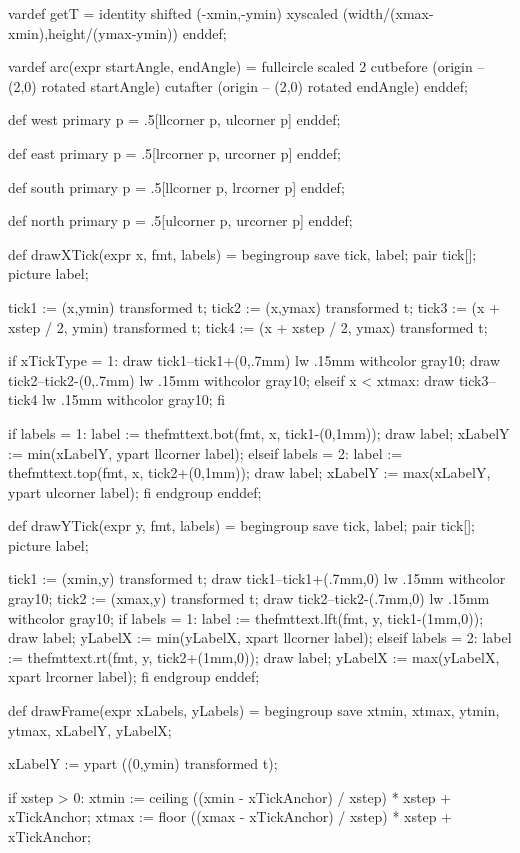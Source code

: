 vardef getT =
  identity shifted (-xmin,-ymin) xyscaled (width/(xmax-xmin),height/(ymax-ymin))
enddef;

vardef arc(expr startAngle, endAngle) =
  fullcircle scaled 2 cutbefore (origin -- (2,0) rotated startAngle) cutafter (origin -- (2,0) rotated endAngle)
enddef;

def west primary p =
  .5[llcorner p, ulcorner p]
enddef;

def east primary p =
  .5[lrcorner p, urcorner p]
enddef;

def south primary p =
  .5[llcorner p, lrcorner p]
enddef;

def north primary p =
  .5[ulcorner p, urcorner p]
enddef;

def drawXTick(expr x, fmt, labels) = begingroup
  save tick, label;
  pair tick[];
  picture label;

  tick1 := (x,ymin) transformed t;
  tick2 := (x,ymax) transformed t;
  tick3 := (x + xstep / 2, ymin) transformed t;
  tick4 := (x + xstep / 2, ymax) transformed t;

  if xTickType = 1:
    draw tick1--tick1+(0,.7mm) lw .15mm withcolor gray10;
    draw tick2--tick2-(0,.7mm) lw .15mm withcolor gray10;
  elseif x < xtmax:
    draw tick3--tick4 lw .15mm withcolor gray10;
  fi

  if labels = 1:
    label := thefmttext.bot(fmt, x, tick1-(0,1mm));
    draw label;
    xLabelY := min(xLabelY, ypart llcorner label);
  elseif labels = 2:
    label := thefmttext.top(fmt, x, tick2+(0,1mm));
    draw label;
    xLabelY := max(xLabelY, ypart ulcorner label);
  fi
endgroup enddef;

def drawYTick(expr y, fmt, labels) = begingroup
  save tick, label;
  pair tick[];
  picture label;

  tick1 := (xmin,y) transformed t;
  draw tick1--tick1+(.7mm,0) lw .15mm withcolor gray10;
  tick2 := (xmax,y) transformed t;
  draw tick2--tick2-(.7mm,0) lw .15mm withcolor gray10;
  if labels = 1:
    label := thefmttext.lft(fmt, y, tick1-(1mm,0));
    draw label;
    yLabelX := min(yLabelX, xpart llcorner label);
  elseif labels = 2:
    label := thefmttext.rt(fmt, y, tick2+(1mm,0));
    draw label;
    yLabelX := max(yLabelX, xpart lrcorner label);
  fi
endgroup enddef;

def drawFrame(expr xLabels, yLabels) = begingroup
  save xtmin, xtmax, ytmin, ytmax, xLabelY, yLabelX;

  xLabelY := ypart ((0,ymin) transformed t);

  if xstep > 0:
    xtmin := ceiling ((xmin - xTickAnchor) / xstep) * xstep + xTickAnchor;
    xtmax := floor ((xmax - xTickAnchor) / xstep) * xstep + xTickAnchor;

